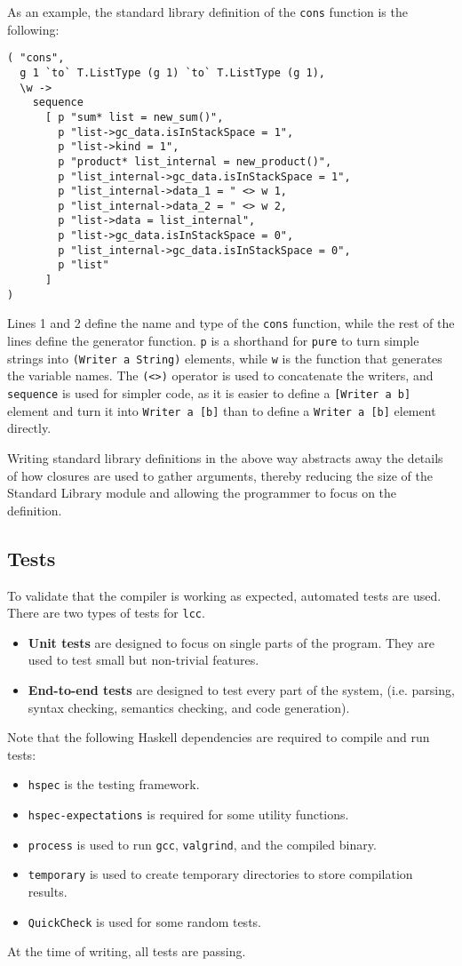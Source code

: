 \documentclass[12pt]{article}
\begin{document}
As an example, the standard library definition of the \verb$cons$ function is
the following:
\lstset{numbers=left}
\begin{lstlisting}
( "cons",
  g 1 `to` T.ListType (g 1) `to` T.ListType (g 1),
  \w ->
    sequence
      [ p "sum* list = new_sum()",
        p "list->gc_data.isInStackSpace = 1",
        p "list->kind = 1",
        p "product* list_internal = new_product()",
        p "list_internal->gc_data.isInStackSpace = 1",
        p "list_internal->data_1 = " <> w 1,
        p "list_internal->data_2 = " <> w 2,
        p "list->data = list_internal",
        p "list->gc_data.isInStackSpace = 0",
        p "list_internal->gc_data.isInStackSpace = 0",
        p "list"
      ]
)
\end{lstlisting}
Lines 1 and 2 define the name and type of the \verb$cons$ function, while the
rest of the lines define the generator function. \verb$p$ is a shorthand for
\verb$pure$ to turn simple strings into \verb$(Writer a String)$ elements, while
\verb$w$ is the function that generates the variable names. The \verb$(<>)$
operator is used to concatenate the writers, and \verb$sequence$ is used for
simpler code, as it is easier to define a \verb$[Writer a b]$ element and turn
it into \verb$Writer a [b]$ than to define a \verb$Writer a [b]$ element
directly.

Writing standard library definitions in the above way abstracts away the details
of how closures are used to gather arguments, thereby reducing the size of the
Standard Library module and allowing the programmer to focus on the definition.

\subsection{Tests}

To validate that the compiler is working as expected, automated tests are used.
There are two types of tests for \verb$lcc$.
\begin{itemize}
    \item \textbf{Unit tests} are designed to focus on single parts of the program.
        They are used to test small but non-trivial features.
    \item \textbf{End-to-end tests} are designed to test every part of the
        system, (i.e. parsing, syntax checking, semantics checking, and code
        generation). 
\end{itemize}
Note that the following Haskell dependencies are required to compile and run
tests:
\begin{itemize}
    \item \verb$hspec$ is the testing framework.
    \item \verb$hspec-expectations$ is required for some utility functions.
    \item \verb$process$ is used to run \verb$gcc$, \verb$valgrind$, and the
        compiled binary.
    \item \verb$temporary$ is used to create temporary directories to store
        compilation results.
    \item \verb$QuickCheck$ is used for some random tests.
\end{itemize}
At the time of writing, all tests are passing.
\end{document}
